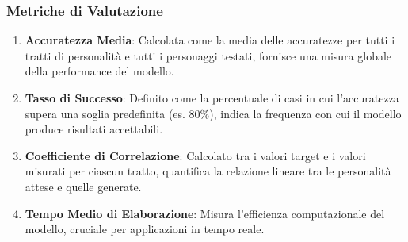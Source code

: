 \subsubsection{Metriche di Valutazione}

\begin{enumerate}
    \item \textbf{Accuratezza Media}: Calcolata come la media delle accuratezze per tutti i tratti di personalità e tutti i personaggi testati, fornisce una misura globale della performance del modello.
    
    \item \textbf{Tasso di Successo}: Definito come la percentuale di casi in cui l'accuratezza supera una soglia predefinita (es. 80\%), indica la frequenza con cui il modello produce risultati accettabili.
    
    \item \textbf{Coefficiente di Correlazione}: Calcolato tra i valori target e i valori misurati per ciascun tratto, quantifica la relazione lineare tra le personalità attese e quelle generate.
    
    \item \textbf{Tempo Medio di Elaborazione}: Misura l'efficienza computazionale del modello, cruciale per applicazioni in tempo reale.
\end{enumerate}

